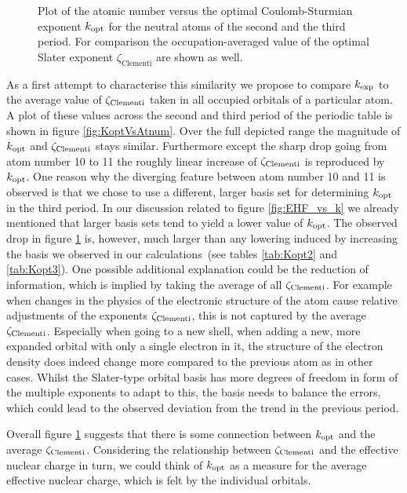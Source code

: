 \begin{figure}
	\centering
	\caption[
		Plot of the atomic number versus the optimal Coulomb-Sturmian exponent
	]{
		Plot of the atomic number versus the optimal Coulomb-Sturmian exponent
		$k_\text{opt}$ for the neutral atoms of the second and the third period.
		For comparison the occupation-averaged value of the \citet{Clementi1963} optimal
		Slater exponent $\zeta_\text{Clementi}$ are shown as well.
	}
	\label{fig:KoptVsAtnum}
\end{figure}
As a first attempt to characterise this similarity we propose
to compare $k_\text{exp}$ to the average value of $\zeta_\text{Clementi}$ taken
in all occupied orbitals of a particular atom.
A plot of these values
across the second and third period of the periodic
table is shown in figure \vref{fig:KoptVsAtnum}.
Over the full depicted range the magnitude of $k_\text{opt}$ and $\zeta_\text{Clementi}$ stays similar.
Furthermore except the sharp drop going from atom number 10 to 11
the roughly linear increase of $\zeta_\text{Clementi}$ is reproduced by $k_\text{opt}$.
One reason why the diverging feature between atom number 10 and 11
is observed is that we chose to use a different, larger \CS basis set
for determining $k_\text{opt}$ in the third period.
In our discussion related to figure \ref{fig:EHF_vs_k}
we already mentioned that larger basis sets tend to
yield a lower value of $k_\text{opt}$.
The observed drop in figure \ref{fig:KoptVsAtnum} is, however,
much larger than any lowering induced by increasing the basis
we observed in our calculations~(see tables \ref{tab:Kopt2} and \ref{tab:Kopt3}).
One possible additional explanation could be the reduction
of information, which is implied by taking the average of all $\zeta_\text{Clementi}$.
For example when changes in the physics of the electronic structure of the atom
cause relative adjustments of the exponents $\zeta_\text{Clementi}$,
this is not captured by the average $\zeta_\text{Clementi}$.
Especially when going to a new shell,
\ie when adding a new, more expanded orbital
with only a single electron in it,
the structure of the electron density does indeed change more
compared to the previous atom as in other cases.
Whilst the Slater-type orbital basis has more degrees of freedom
in form of the multiple exponents to adapt to this,
the \CS basis needs to balance the errors,
which could lead to the observed deviation from the trend in the previous period.

Overall figure \ref{fig:KoptVsAtnum} suggests
that there is some connection between $k_\text{opt}$ and the average $\zeta_\text{Clementi}$.
Considering the relationship between $\zeta_\text{Clementi}$ and the effective nuclear charge in turn,
we could think of $k_\text{opt}$ as a measure for the average effective nuclear charge,
which is felt by the individual orbitals.

